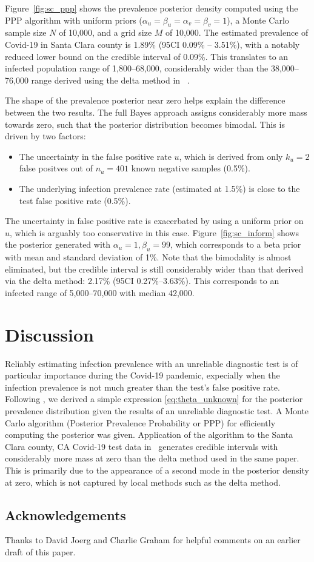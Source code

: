 \documentclass[dvipdfmx]{article}
\begin{document}
Figure~\ref{fig:sc_ppp} shows the prevalence posterior density
computed using the PPP algorithm with uniform priors
($\alpha_u=\beta_u=\alpha_v=\beta_v=1$), a Monte Carlo sample size $N$
of 10,000, and a grid size $M$ of 10,000. The estimated prevalence of
Covid-19 in Santa Clara county is 1.89\% (95CI 0.09\% -- 3.51\%), with
a notably reduced lower bound on the credible interval of 0.09\%. This
translates to an infected population range of 1,800--68,000,
considerably wider than the 38,000--76,000 range derived using the
delta method in ~\cite{Bendavid2020.04.14.20062463}.

The shape of the prevalence posterior near zero helps explain the
difference between the two results. The full Bayes approach assigns
considerably more mass towards zero, such that the posterior
distribution becomes bimodal. This is driven by two factors:
\begin{itemize}
  \item The uncertainty in the false positive rate $u$, which is
    derived from only $k_u=2$ false positves out of $n_u=401$ known
    negative samples (0.5\%).
  \item The underlying infection prevalence rate (estimated at 1.5\%)
    is close to the test false positive rate (0.5\%).
\end{itemize}

The uncertainty in false positive rate is exacerbated by using a
uniform prior on $u$, which is arguably too conservative in this
case. Figure~\ref{fig:sc_inform} shows the posterior generated with
$\alpha_u=1, \beta_u=99$, which corresponds to a beta prior with mean
and standard deviation of 1\%. Note that the bimodality is almost
eliminated, but the credible interval is still considerably wider than
that derived via the delta method: 2.17\% (95CI 0.27\%--3.63\%). This
corresponds to an infected range of 5,000--70,000 with median 42,000.


\section{Discussion}
Reliably estimating infection prevalence with an unreliable diagnostic
test is of particular importance during the Covid-19 pandemic,
expecially when the infection prevalence is not much greater than the
test's false positive rate.  Following
\cite{diggle_2011,greenland_1996}, we derived a simple expression
\eqref{eq:theta_unknown} for the posterior prevalence distribution
given the results of an unreliable diagnostic test. A Monte Carlo
algorithm (Posterior Prevalence Probability or PPP) for efficiently
computing the posterior was given. Application of the algorithm to the
Santa Clara county, CA Covid-19 test data
in~\cite{Bendavid2020.04.14.20062463} generates credible intervals
with considerably more mass at zero than the delta method used in the
same paper. This is primarily due to the appearance of a second mode
in the posterior density at zero, which is not captured by local
methods such as the delta method.

\subsection*{Acknowledgements}
Thanks to David Joerg and Charlie Graham for helpful comments on an
earlier draft of this paper.



\end{document}
